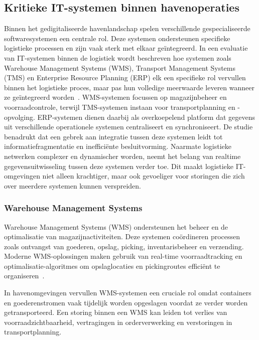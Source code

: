 \subsection{Kritieke IT-systemen binnen havenoperaties}

Binnen het gedigitaliseerde havenlandschap spelen verschillende gespecialiseerde softwaresystemen een centrale rol. Deze systemen ondersteunen specifieke logistieke processen en zijn vaak sterk met elkaar geïntegreerd. In een evaluatie van IT-systemen binnen de logistiek wordt beschreven hoe systemen zoals Warehouse Management Systems (WMS), Transport Management Systems (TMS) en Enterprise Resource Planning (ERP) elk een specifieke rol vervullen binnen het logistieke proces, maar pas hun volledige meerwaarde leveren wanneer ze geïntegreerd worden~\autocite{EvaluationITSysLogistics2024}. WMS-systemen focussen op magazijnbeheer en voorraadcontrole, terwijl TMS-systemen instaan voor transportplanning en -opvolging. ERP-systemen dienen daarbij als overkoepelend platform dat gegevens uit verschillende operationele systemen centraliseert en synchroniseert. De studie benadrukt dat een gebrek aan integratie tussen deze systemen leidt tot informatiefragmentatie en inefficiënte besluitvorming. Naarmate logistieke netwerken complexer en dynamischer worden, neemt het belang van realtime gegevensuitwisseling tussen deze systemen verder toe. Dit maakt logistieke IT-omgevingen niet alleen krachtiger, maar ook gevoeliger voor storingen die zich over meerdere systemen kunnen verspreiden.

\subsubsection{Warehouse Management Systems}

Warehouse Management Systems (WMS) ondersteunen het beheer en de optimalisatie van magazijnactiviteiten. Deze systemen coördineren processen zoals ontvangst van goederen, opslag, picking, inventarisbeheer en verzending. Moderne WMS-oplossingen maken gebruik van real-time voorraadtracking en optimalisatie-algoritmes om opslaglocaties en pickingroutes efficiënt te organiseren~\autocite{Matthias2025}.

In havenomgevingen vervullen WMS-systemen een cruciale rol omdat containers en goederenstromen vaak tijdelijk worden opgeslagen voordat ze verder worden getransporteerd. Een storing binnen een WMS kan leiden tot verlies van voorraadzichtbaarheid, vertragingen in orderverwerking en verstoringen in transportplanning.

